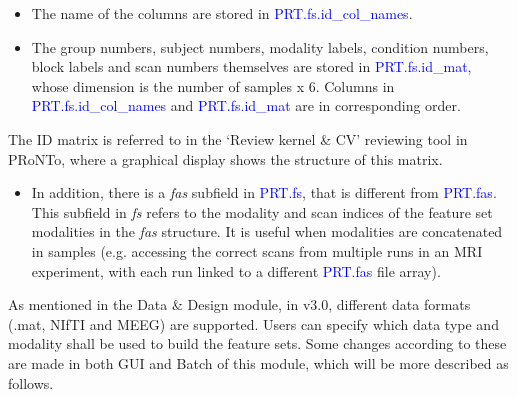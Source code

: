\begin{itemize}
\item The name of the columns are stored in \textcolor{blue}{PRT.fs.id\_col\_names}.
\item The group numbers, subject numbers, modality labels, condition numbers, block labels and scan numbers themselves are stored in \textcolor{blue}{PRT.fs.id\_mat}, whose dimension is the number of samples x 6. Columns in \textcolor{blue}{PRT.fs.id\_col\_names} and \textcolor{blue}{PRT.fs.id\_mat} are in corresponding order.
\end{itemize}

The ID matrix is referred to in the `Review kernel \& CV' reviewing tool in PRoNTo, where a graphical display shows the structure of this matrix.

\begin{itemize}
\item In addition, there is a \textit{fas} subfield in \textcolor{blue}{PRT.fs}, that is different from \textcolor{blue}{PRT.fas}. This subfield in \textit{fs} refers to the modality and scan indices of the feature set modalities in the \textit{fas} structure. It is useful when modalities are concatenated in samples (e.g. accessing the correct scans from multiple runs in an MRI experiment, with each run linked to a different \textcolor{blue}{PRT.fas} file array).

\end{itemize} 

As mentioned in the Data \& Design module, in v3.0, different data formats (.mat, NIfTI and MEEG) are supported. Users can specify which data type and modality shall be used to build the feature sets. Some changes according to these are made in both GUI and Batch of this module, which will be more described as follows. 






